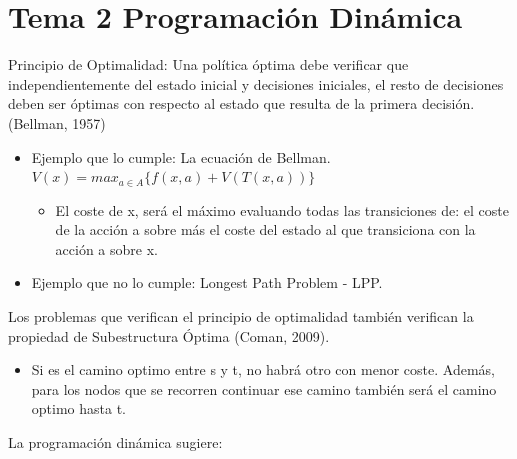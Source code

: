 \documentclass[12pt, twoside, openright]{report} %
\begin{document}
\chapter{Tema 2 Programación Dinámica}

 
    Principio de Optimalidad: Una política óptima debe verificar que
    independientemente del estado inicial y decisiones iniciales, el
    resto de decisiones deben ser óptimas con respecto al estado que
    resulta de la primera decisión. (Bellman, 1957)

    \begin{itemize}
    \item
      Ejemplo que lo cumple: La ecuación de Bellman.
      \(V(x)= max_{a \in A} \{ f(x,a)+V(T(x,a))\}\)

      \begin{itemize}
    
      \item
        El coste de x, será el máximo evaluando todas las transiciones
        de: el coste de la acción a sobre más el coste del estado al que
        transiciona con la acción a sobre x.
      \end{itemize}
    \item
      Ejemplo que no lo cumple: Longest Path Problem - LPP.
    \end{itemize}

	Los problemas que verifican el principio de optimalidad también
    verifican la propiedad de Subestructura Óptima (Coman, 2009).

    \begin{itemize}
  
    \item
      Si es el camino optimo entre s y t, no habrá otro con menor coste.
      Además, para los nodos que se recorren continuar ese camino
      también será el camino optimo hasta t.
    \end{itemize}

	La programación dinámica sugiere:
\end{document}
